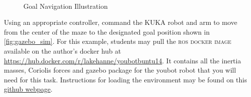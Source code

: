 %
\begin{figure}[tb!]
	\centering
	~ %
	\caption{Goal Navigation Illustration}
	\label{fig:gazebo_sim}
\end{figure}

\begin{homework}
	Using an appropriate controller, command the KUKA robot and arm to move from the center of the maze to the designated goal position shown in \autoref{fig:gazebo_sim}. For this example, students may pull the \textsc{ros docker image} available on the author's docker hub at \href{https://hub.docker.com/r/lakehanne/youbotbuntu14}{https://hub.docker.com/r/lakehanne/youbotbuntu14}. It contains all the inertia masses, Coriolis forces and gazebo package for the youbot robot that you will need for this task. Instructions for loading the environment may be found on this \href{https://github.com/lakehanne/youbot}{github webpage}.
\end{homework}




